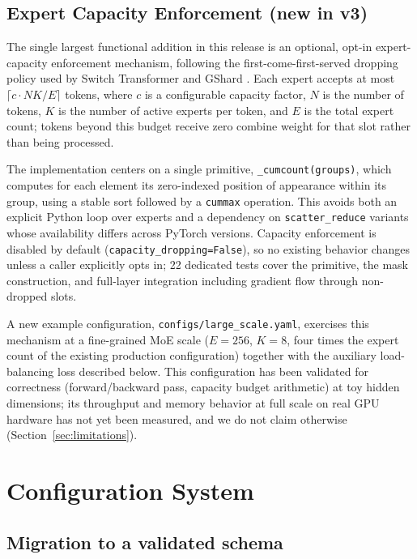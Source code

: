 \documentclass[11pt]{article}
\begin{document}
\subsection{Expert Capacity Enforcement (new in v3)}
\label{sec:capacity}

The single largest functional addition in this release is an optional,
opt-in expert-capacity enforcement mechanism, following the
first-come-first-served dropping policy used by Switch Transformer
\cite{fedus2021switch} and GShard \cite{lepikhin2020gshard}. Each expert
accepts at most $\lceil c \cdot N K / E \rceil$ tokens, where $c$ is a
configurable capacity factor, $N$ is the number of tokens, $K$ is the
number of active experts per token, and $E$ is the total expert count;
tokens beyond this budget receive zero combine weight for that slot rather
than being processed.

The implementation centers on a single primitive,
\texttt{\_cumcount(groups)}, which computes for each element its
zero-indexed position of appearance within its group, using a stable sort
followed by a \texttt{cummax} operation. This avoids both an explicit
Python loop over experts and a dependency on \texttt{scatter\_reduce}
variants whose availability differs across PyTorch versions. Capacity
enforcement is disabled by default (\texttt{capacity\_dropping=False}),
so no existing behavior changes unless a caller explicitly opts in; 22
dedicated tests cover the primitive, the mask construction, and full-layer
integration including gradient flow through non-dropped slots.

A new example configuration, \texttt{configs/large\_scale.yaml}, exercises
this mechanism at a fine-grained MoE scale ($E{=}256$, $K{=}8$, four times
the expert count of the existing production configuration) together with
the auxiliary load-balancing loss described below. This configuration has
been validated for correctness (forward/backward pass, capacity budget
arithmetic) at toy hidden dimensions; its throughput and memory behavior
at full scale on real GPU hardware has not yet been measured, and we do
not claim otherwise (Section~\ref{sec:limitations}).

\section{Configuration System}
\label{sec:config}

\subsection{Migration to a validated schema}
\end{document}
